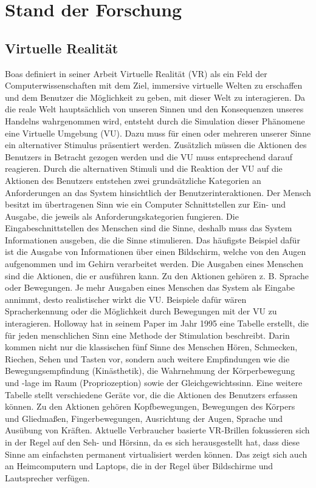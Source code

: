 \chapter{Stand der Forschung}

\section{Virtuelle Realität}
Boas definiert in  seiner Arbeit \cite{Boas2012} Virtuelle Realität (VR) als ein Feld der Computerwissenschaften mit dem Ziel, immersive virtuelle Welten zu erschaffen und dem Benutzer die Möglichkeit zu geben, mit dieser Welt zu interagieren. 
Da die reale Welt hauptsächlich von unseren Sinnen und den Konsequenzen unseres Handelns wahrgenommen wird, entsteht durch die Simulation dieser Phänomene eine Virtuelle Umgebung (VU). Dazu muss für einen oder mehreren unserer Sinne ein alternativer Stimulus präsentiert werden. Zusätzlich müssen die Aktionen des Benutzers in Betracht gezogen werden und die VU muss entsprechend darauf reagieren.
Durch die alternativen Stimuli und die Reaktion der VU auf die Aktionen des Benutzers entstehen zwei grundsätzliche Kategorien an Anforderungen an das System hinsichtlich der Benutzerinteraktionen. Der Mensch besitzt im übertragenen Sinn wie ein Computer Schnittstellen zur Ein- und Ausgabe, die jeweils als Anforderungskategorien fungieren. Die Eingabeschnittstellen des Menschen sind die Sinne, deshalb muss das System Informationen ausgeben, die die Sinne stimulieren. Das häufigste Beispiel dafür ist die Ausgabe von Informationen über einen Bildschirm, welche von den Augen aufgenommen und im Gehirn verarbeitet werden. Die Ausgaben eines Menschen sind die Aktionen, die er ausführen kann. Zu den Aktionen gehören z. B. Sprache oder Bewegungen. Je mehr Ausgaben eines Menschen das System als Eingabe annimmt, desto realistischer wirkt die VU. Beispiele dafür wären Spracherkennung oder die Möglichkeit durch Bewegungen mit der VU zu interagieren.
Holloway\cite{Holloway1995} hat in seinem Paper im Jahr 1995 eine Tabelle erstellt, die für jeden menschlichen Sinn eine Methode der Stimulation beschreibt. Darin kommen nicht nur die klassischen fünf Sinne des Menschen Hören, Schmecken, Riechen, Sehen und Tasten vor, sondern auch weitere Empfindungen wie die Bewegungsempfindung (Kinästhetik), die Wahrnehmung der Körperbewegung und -lage im Raum (Propriozeption) sowie der Gleichgewichtssinn.
Eine weitere Tabelle stellt verschiedene Geräte vor, die die Aktionen des Benutzers erfassen können. Zu den Aktionen gehören Kopfbewegungen, Bewegungen des Körpers und Gliedmaßen, Fingerbewegungen, Ausrichtung der Augen, Sprache und Ausübung von Kräften.
Aktuelle Verbraucher basierte VR-Brillen fokussieren sich in der Regel auf den Seh- und Hörsinn, da es sich herausgestellt hat, dass diese Sinne am einfachsten permanent virtualisiert werden können. Das zeigt sich auch an Heimcomputern und Laptops, die in der Regel über Bildschirme und Lautsprecher verfügen.\cite{Holloway1995}

